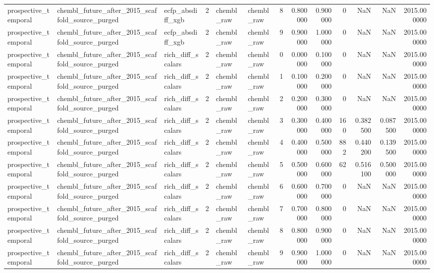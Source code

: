 \begin{longtable}{lllrllrrrrrrr}
prospective\_temporal & chembl\_future\_after\_2015\_scaffold\_source\_purged & ecfp\_absdiff\_xgb & 2 & chembl\_raw & chembl\_raw & 8 & 0.800000 & 0.900000 & 0 & NaN & NaN & 2015.000000 \\
prospective\_temporal & chembl\_future\_after\_2015\_scaffold\_source\_purged & ecfp\_absdiff\_xgb & 2 & chembl\_raw & chembl\_raw & 9 & 0.900000 & 1.000000 & 0 & NaN & NaN & 2015.000000 \\
prospective\_temporal & chembl\_future\_after\_2015\_scaffold\_source\_purged & rich\_diff\_scalars & 2 & chembl\_raw & chembl\_raw & 0 & 0.000000 & 0.100000 & 0 & NaN & NaN & 2015.000000 \\
prospective\_temporal & chembl\_future\_after\_2015\_scaffold\_source\_purged & rich\_diff\_scalars & 2 & chembl\_raw & chembl\_raw & 1 & 0.100000 & 0.200000 & 0 & NaN & NaN & 2015.000000 \\
prospective\_temporal & chembl\_future\_after\_2015\_scaffold\_source\_purged & rich\_diff\_scalars & 2 & chembl\_raw & chembl\_raw & 2 & 0.200000 & 0.300000 & 0 & NaN & NaN & 2015.000000 \\
prospective\_temporal & chembl\_future\_after\_2015\_scaffold\_source\_purged & rich\_diff\_scalars & 2 & chembl\_raw & chembl\_raw & 3 & 0.300000 & 0.400000 & 160 & 0.382500 & 0.087500 & 2015.000000 \\
prospective\_temporal & chembl\_future\_after\_2015\_scaffold\_source\_purged & rich\_diff\_scalars & 2 & chembl\_raw & chembl\_raw & 4 & 0.400000 & 0.500000 & 882 & 0.440200 & 0.139500 & 2015.000000 \\
prospective\_temporal & chembl\_future\_after\_2015\_scaffold\_source\_purged & rich\_diff\_scalars & 2 & chembl\_raw & chembl\_raw & 5 & 0.500000 & 0.600000 & 62 & 0.516100 & 0.500000 & 2015.000000 \\
prospective\_temporal & chembl\_future\_after\_2015\_scaffold\_source\_purged & rich\_diff\_scalars & 2 & chembl\_raw & chembl\_raw & 6 & 0.600000 & 0.700000 & 0 & NaN & NaN & 2015.000000 \\
prospective\_temporal & chembl\_future\_after\_2015\_scaffold\_source\_purged & rich\_diff\_scalars & 2 & chembl\_raw & chembl\_raw & 7 & 0.700000 & 0.800000 & 0 & NaN & NaN & 2015.000000 \\
prospective\_temporal & chembl\_future\_after\_2015\_scaffold\_source\_purged & rich\_diff\_scalars & 2 & chembl\_raw & chembl\_raw & 8 & 0.800000 & 0.900000 & 0 & NaN & NaN & 2015.000000 \\
prospective\_temporal & chembl\_future\_after\_2015\_scaffold\_source\_purged & rich\_diff\_scalars & 2 & chembl\_raw & chembl\_raw & 9 & 0.900000 & 1.000000 & 0 & NaN & NaN & 2015.000000 \\

\end{longtable}
